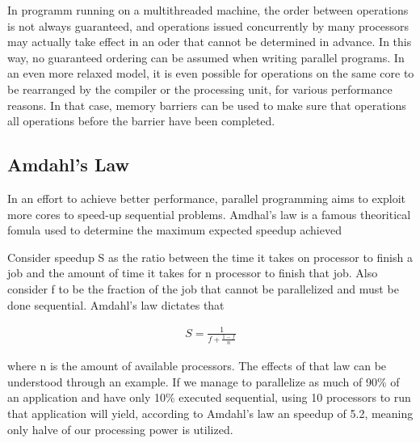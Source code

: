 In  programm running on a multithreaded machine, the order between operations is not always guaranteed, and operations issued concurrently by many processors may actually take effect in an oder that cannot be determined in advance. In this way, no guaranteed ordering can be assumed when writing parallel programs. In an even more relaxed model, it is even possible for operations on the same core to be rearranged by the compiler or the processing unit, for various performance reasons. In that case, memory barriers can be used to make sure that operations all operations before the barrier have been completed.

\subsection{Amdahl's Law}

In an effort to achieve better performance, parallel programming aims to exploit more cores to speed-up sequential problems. Amdhal's law is a famous theoritical fomula used to determine the maximum expected speedup achieved

Consider speedup S as the ratio between the time it takes on processor to finish a job and the amount of time it takes for n processor to finish that job. Also consider f to be the fraction of the job  that cannot be parallelized and must be done sequential. Amdahl's law dictates that 

\begin{align*}
	S = \frac{1}{f + \frac{1-f}{n}}
\end{align*}

where n is the amount of available processors. The effects of that law can be understood through an example. If we manage to parallelize as much of 90\% of an application and have only 10\% executed sequential, using 10 processors to run that application will yield, according to Amdahl's law an speedup of 5.2, meaning only halve of our processing power is utilized. 

